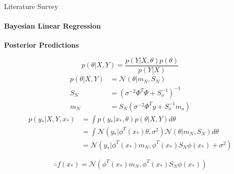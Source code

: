 \documentclass[handout,9pt]{beamer}
\numberwithin{theorem}{section}
\begin{document}
\begin{frame}{Literature Survey}
	\begin{spacing}{1}
		\framesubtitle{Bayesian Linear Regression}
		\textbf{Posterior Predictions}\\
		\begin{footnotesize}
		\begin{equation*}
			p(\theta|X, Y) = \frac{p(Y|X, \theta)p(\theta)}{p(Y|X)}
		\end{equation*}\pause
	\begin{align*}
		p(\theta|X, Y) &= \mathcal{N}(\theta|m_N, S_N)\\
		S_N &= (\sigma^{-2}\Phi^T\Phi + S_o^{-1})^{-1}\\
		m_N &= S_N(\sigma^{-2}\Phi^Ty + S_o^{-1}m_o)
	\end{align*}\pause
		\begin{align*}
			p(y_*| X, Y, x_*) &= \int p(y_*|x_*, \theta)p(\theta|X, Y)d\theta\\
			&= \int \mathcal{N}(y_*|\phi^T(x_*)\theta, \sigma^2)\mathcal{N}(\theta|m_N, S_N)d\theta\\
			&= \mathcal{N}(y_*| \phi^T(x_*)m_N, \phi^T(x_*)S_N\phi(x_*) + \sigma^2)
		\end{align*}\pause

		\begin{equation*}
			\therefore f(x_*) = \mathcal{N}(\phi^T(x_*)m_N, \phi^T(x_*)S_N\phi(x_*))
		\end{equation*}
	
	\end{footnotesize}
	\end{spacing}
\end{frame}
\end{document}
